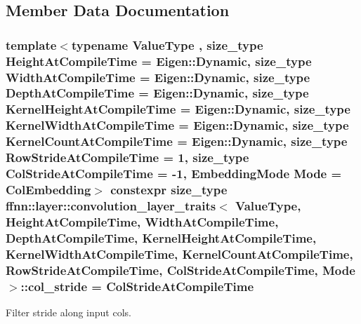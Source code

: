 \subsection{Member Data Documentation}
\hypertarget{structffnn_1_1layer_1_1convolution__layer__traits_a36aab5cc1478feddd1085cf54b44246e}{
\subsubsection[{col\-\_\-stride}]{\setlength{\rightskip}{0pt plus 5cm}template$<$typename Value\-Type , size\-\_\-type Height\-At\-Compile\-Time = Eigen\-::\-Dynamic, size\-\_\-type Width\-At\-Compile\-Time = Eigen\-::\-Dynamic, size\-\_\-type Depth\-At\-Compile\-Time = Eigen\-::\-Dynamic, size\-\_\-type Kernel\-Height\-At\-Compile\-Time = Eigen\-::\-Dynamic, size\-\_\-type Kernel\-Width\-At\-Compile\-Time = Eigen\-::\-Dynamic, size\-\_\-type Kernel\-Count\-At\-Compile\-Time = Eigen\-::\-Dynamic, size\-\_\-type Row\-Stride\-At\-Compile\-Time = 1, size\-\_\-type Col\-Stride\-At\-Compile\-Time = -\/1, Embedding\-Mode Mode = Col\-Embedding$>$ constexpr {\bf size\-\_\-type} {\bf ffnn\-::layer\-::convolution\-\_\-layer\-\_\-traits}$<$ Value\-Type, Height\-At\-Compile\-Time, Width\-At\-Compile\-Time, Depth\-At\-Compile\-Time, Kernel\-Height\-At\-Compile\-Time, Kernel\-Width\-At\-Compile\-Time, Kernel\-Count\-At\-Compile\-Time, Row\-Stride\-At\-Compile\-Time, Col\-Stride\-At\-Compile\-Time, Mode $>$\-::col\-\_\-stride = Col\-Stride\-At\-Compile\-Time\hspace{0.3cm}{\ttfamily [static]}}}\label{structffnn_1_1layer_1_1convolution__layer__traits_a36aab5cc1478feddd1085cf54b44246e}


Filter stride along input cols. 

